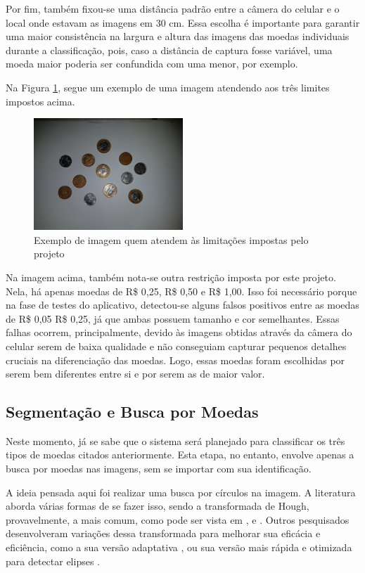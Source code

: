 \documentclass[10pt,journal,compsoc]{IEEEtran}
\begin{document}
Por fim, também fixou-se uma distância padrão entre a câmera do celular e o local onde estavam as imagens em 30 cm. Essa escolha é importante para garantir uma maior consistência na largura e altura das imagens das moedas individuais durante a classificação, pois, caso a distância de captura fosse variável, uma moeda maior poderia ser confundida com uma menor, por exemplo.

Na Figura \ref{fig:criterios}, segue um exemplo de uma imagem atendendo aos três limites impostos acima.

\begin{figure}[ht]
\centering
\caption{Exemplo de imagem quem atendem às limitações impostas pelo projeto}
\label{fig:criterios}
\includegraphics[width=0.5\textwidth]{completa4.jpg}
\end{figure}

Na imagem acima, também nota-se outra restrição imposta por este projeto. Nela, há apenas moedas de R\$ 0,25, R\$ 0,50 e R\$ 1,00. Isso foi necessário porque na fase de testes do aplicativo, detectou-se alguns falsos positivos entre as moedas de R\$ 0,05 R\$ 0,25, já que ambas possuem tamanho e cor semelhantes. Essas falhas ocorrem, principalmente, devido às imagens obtidas através da câmera do celular serem de baixa qualidade e não conseguiam capturar pequenos detalhes cruciais na diferenciação das moedas. Logo, essas moedas foram escolhidas por serem bem diferentes entre si e por serem as de maior valor.


\subsection{Segmentação e Busca por Moedas}
\label{sec:metodologia:rna}

Neste momento, já se sabe que o sistema será planejado para classificar os três tipos de moedas citados anteriormente. Esta etapa, no entanto, envolve apenas a busca por moedas nas imagens, sem se importar com sua identificação.

A ideia pensada aqui foi realizar uma busca por círculos na imagem. A literatura aborda várias formas de se fazer isso, sendo a transformada de Hough, provavelmente, a mais comum, como pode ser vista em \cite{ioannou1999circle}, \cite{kerbyson1995circle} e \cite{yuen1990comparative}. Outros pesquisados desenvolveram variações dessa transformada para melhorar sua eficácia e eficiência, como a sua versão adaptativa \cite{illingworth1987adaptive}, ou sua versão mais rápida e otimizada para detectar elipses \cite{guil1997lower}.
\end{document}
